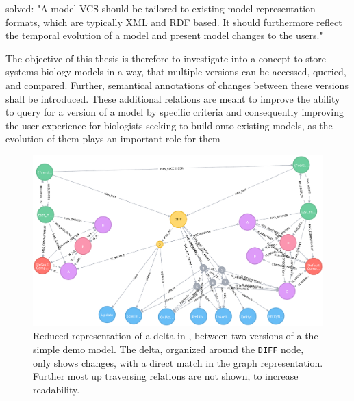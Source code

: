solved:
"A model VCS should be tailored to existing model representation formats, which are typically XML and RDF based. It should furthermore reflect the temporal evolution of a model and present model changes to the users." \citep{Waltemath2013}

The objective of this thesis is therefore to investigate into a concept to store systems biology models in a way, that multiple versions can be accessed, queried, and compared. Further, semantical annotations of changes between these versions shall be introduced. These additional relations are meant to improve the ability to query for a version of a model by specific criteria and consequently improving the user experience for biologists seeking to build onto existing models, as the evolution of them plays an important role for them \citep{Scharm2015}

\begin{figure}
	\centering
	\includegraphics[width=\textwidth]{resources/neo4j-renders/demo-sbml-simple-diff.pdf}
	\caption[Reduced representation of a delta in \masymos, between two versions of a the simple \sbml demo model]{Reduced representation of a delta in \masymos, between two versions of a the simple \sbml demo model. The delta, organized around the \texttt{DIFF} node, only shows changes, with a direct match in the graph representation. Further most up traversing relations are not shown, to increase readability.}
	\label{fig:results:simple-diff}
	
\end{figure}